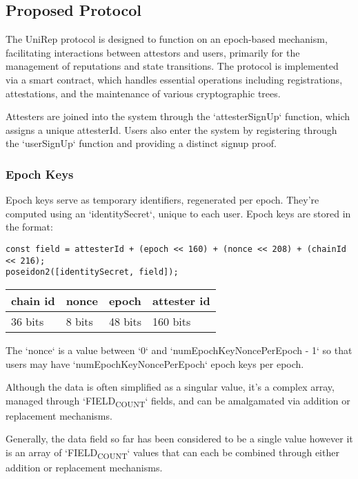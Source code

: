 \documentclass[11pt]{article}
\begin{document}
\subsection{Proposed Protocol}
\label{sec:orgb12f105}

The UniRep protocol is designed to function on an epoch-based mechanism, facilitating interactions between attestors and users, primarily for the management of reputations and state transitions. The protocol is implemented via a smart contract, which handles essential operations including registrations, attestations, and the maintenance of various cryptographic trees.

Attesters are joined into the system through the `attesterSignUp` function, which assigns a unique attesterId. Users also enter the system by registering through the `userSignUp` function and providing a distinct signup proof.
\subsubsection{Epoch Keys}
\label{sec:org75b675e}

Epoch keys serve as temporary identifiers, regenerated per epoch. They're computed using an `identitySecret`, unique to each user. Epoch keys are stored in the format:

\begin{verbatim}
const field = attesterId + (epoch << 160) + (nonce << 208) + (chainId << 216);
poseidon2([identitySecret, field]);
\end{verbatim}

\begin{center}
\begin{tabular}{llll}
chain id & nonce & epoch & attester id\\[0pt]
\hline
36 bits & 8 bits & 48 bits & 160 bits\\[0pt]
\end{tabular}
\end{center}

The `nonce` is a value between `0` and `numEpochKeyNoncePerEpoch - 1` so that users may have `numEpochKeyNoncePerEpoch` epoch keys per epoch.

Although the data is often simplified as a singular value, it's a complex array, managed through `FIELD\textsubscript{COUNT}` fields, and can be amalgamated via addition or replacement mechanisms.

Generally, the data field so far has been considered to be a single value however it is an array of `FIELD\textsubscript{COUNT}` values that can each be combined through either addition or replacement mechanisms.
\end{document}
